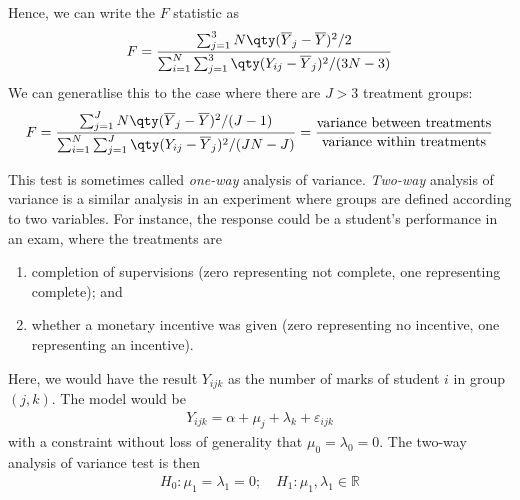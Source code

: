 Hence, we can write the $F$ statistic as
\begin{align*}
	F = \frac{\sum_{j=1}^3 N \qty(\overline Y_j - \overline Y)^2 / 2}{\sum_{i=1}^N \sum_{j=1}^3 \qty(Y_{ij} - \overline Y_j)^2 / (3N-3)}
\end{align*}
We can generatlise this to the case where there are $J > 3$ treatment groups:
\begin{align*}
	F = \frac{\sum_{j=1}^J N \qty(\overline Y_j - \overline Y)^2 / (J-1)}{\sum_{i=1}^N \sum_{j=1}^J \qty(Y_{ij} - \overline Y_j)^2 / (JN-J)} = \frac{\text{variance between treatments}}{\text{variance within treatments}}
\end{align*}
\begin{remark}
	This test is sometimes called \textit{one-way} analysis of variance.
	\textit{Two-way} analysis of variance is a similar analysis in an experiment where groups are defined according to two variables.
	For instance, the response could be a student's performance in an exam, where the treatments are
	\begin{enumerate}
		\item completion of supervisions (zero representing not complete, one representing complete); and
		\item whether a monetary incentive was given (zero representing no incentive, one representing an incentive).
	\end{enumerate}
	Here, we would have the result $Y_{ijk}$ as the number of marks of student $i$ in group $(j,k)$.
	The model would be
	\begin{align*}
		Y_{ijk} = \alpha + \mu_j + \lambda_k + \varepsilon_{ijk}
	\end{align*}
	with a constraint without loss of generality that $\mu_0 = \lambda_0 = 0$.
	The two-way analysis of variance test is then
	\begin{align*}
		H_0 \colon \mu_1 = \lambda_1 = 0;\quad H_1 \colon \mu_1, \lambda_1 \in \mathbb R
	\end{align*}
\end{remark}

